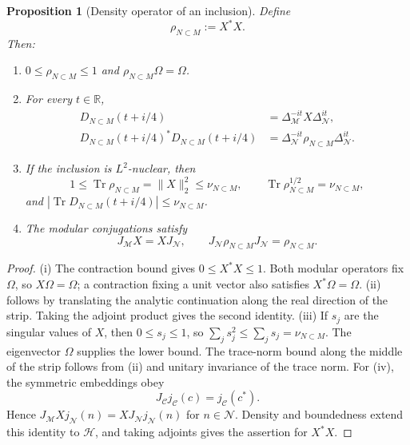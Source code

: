 \documentclass[a4paper,11pt]{article}
\newtheorem{proposition}[theorem]{Proposition}
\theoremstyle{definition}
\begin{document}
\begin{proposition}[Density operator of an inclusion]\label{prop:rho-inclusion}
Define
\begin{equation}
 \rho_{N\subset M}:=X^*X.
 \label{eq:rho-inclusion}
\end{equation}
Then:
\begin{enumerate}
 \item[\rm(i)] $0\le\rho_{N\subset M}\le1$ and $\rho_{N\subset M}\Omega=\Omega$.
 \item[\rm(ii)] For every $t\in\mathbb R$,
 \begin{align}
  D_{N\subset M}(t+i/4)
    &=\Delta_{\mathcal M}^{-it}X\Delta_{\mathcal N}^{it},\nonumber\\
  D_{N\subset M}(t+i/4)^*D_{N\subset M}(t+i/4)
    &=\Delta_{\mathcal N}^{-it}\rho_{N\subset M}\Delta_{\mathcal N}^{it}.
  \label{eq:rho-transport}
 \end{align}
 \item[\rm(iii)] If the inclusion is $L^2$-nuclear, then
 \begin{equation}
  1\le\operatorname{Tr}\rho_{N\subset M}=\|X\|_2^2\le\nu_{N\subset M},
  \qquad \operatorname{Tr}\rho_{N\subset M}^{1/2}=\nu_{N\subset M},
  \label{eq:inclusion-trace-bounds}
 \end{equation}
 and $|\operatorname{Tr}D_{N\subset M}(t+i/4)|\le\nu_{N\subset M}$.
 \item[\rm(iv)] The modular conjugations satisfy
 \begin{equation}
  J_{\mathcal M}X=XJ_{\mathcal N},
  \qquad J_{\mathcal N}\rho_{N\subset M}J_{\mathcal N}=\rho_{N\subset M}.
  \label{eq:inclusion-real-structure}
 \end{equation}
\end{enumerate}
\end{proposition}
\begin{proof}
(i) The contraction bound gives $0\le X^*X\le1$. Both modular operators fix $\Omega$, so $X\Omega=\Omega$; a contraction fixing a unit vector also satisfies $X^*\Omega=\Omega$. (ii) follows by translating the analytic continuation along the real direction of the strip. Taking the adjoint product gives the second identity. (iii) If $s_j$ are the singular values of $X$, then $0\le s_j\le1$, so $\sum_j s_j^2\le\sum_j s_j=\nu_{N\subset M}$. The eigenvector $\Omega$ supplies the lower bound. The trace-norm bound along the middle of the strip follows from (ii) and unitary invariance of the trace norm. For (iv), the symmetric embeddings obey
\begin{equation}
 J_{\mathcal C}j_{\mathcal C}(c)=j_{\mathcal C}(c^*).
\end{equation}
Hence $J_{\mathcal M}Xj_{\mathcal N}(n)=XJ_{\mathcal N}j_{\mathcal N}(n)$ for $n\in\mathcal N$. Density and boundedness extend this identity to $\mathcal H$, and taking adjoints gives the assertion for $X^*X$.
\end{proof}
\end{document}
